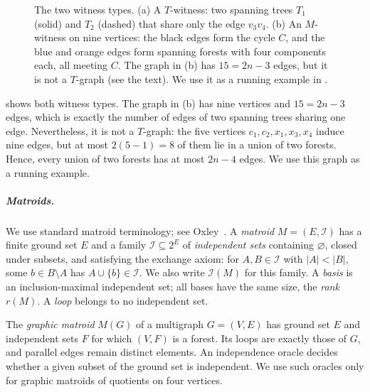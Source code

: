 \documentclass[USenglish, a4paper, thm-restate,numberwithinsect, cleveref]{lipics-v2021}
\begin{document}
\begin{figure}[t]
\caption{The two witness types.
(a) A $T$-witness: two spanning trees $T_1$ (solid) and $T_2$ (dashed)
that share only the edge $v_3v_4$. (b) An $M$-witness on nine vertices:
the black edges form the cycle $C$, and the blue and orange edges form
spanning forests with four components each, all meeting $C$. The graph
in (b) has $15=2n-3$ edges, but it is not a $T$-graph (see the text). We use it as a running example
in .}
\label{fig:m-graph}
\end{figure}

 shows both witness types. The graph in
(b) has nine vertices and $15=2n-3$ edges, which is
exactly the number of edges of two spanning trees sharing one edge.
Nevertheless, it is not a $T$-graph: the five vertices
$c_1,c_2,x_1,x_3,x_4$ induce nine edges, but at most
$2(5-1)=8$ of them lie in a union of two forests. Hence, every union of
two forests has at most $2n-4$ edges. We use this graph as a running
example.

\subparagraph*{Matroids.}
We use standard matroid terminology; see Oxley~\cite{Oxley2011}.
A \emph{matroid} $M=(E,\mathcal{I})$ has a finite ground set $E$ and
a family $\mathcal{I}\subseteq2^E$ of \emph{independent sets} containing
$\varnothing$, closed under subsets, and satisfying the exchange
axiom: for $A,B\in\mathcal{I}$ with $|A|<|B|$, some $b\in B\setminus A$
has $A\cup\{b\}\in\mathcal{I}$. We also write $\mathcal{I}(M)$ for
this family. A \emph{basis} is an inclusion-maximal independent set;
all bases have the same size, the \emph{rank} $r(M)$. A \emph{loop}
belongs to no independent set.

The \emph{graphic matroid} $M(G)$ of a multigraph $G=(V,E)$ has ground
set $E$ and independent sets $F$ for which $(V,F)$ is a forest.
Its loops are exactly those of $G$, and parallel edges remain distinct
elements. 
An independence oracle decides whether a given subset of the ground
set is independent. We use such oracles only for graphic matroids of
quotients on four vertices.
\end{document}
